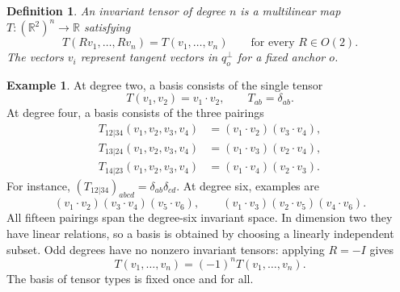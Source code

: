 \documentclass[11pt]{article}
\newcommand{\R}{\mathbb R}
\numberwithin{equation}{section}
\newtheorem{definition}[theorem]{Definition}
\theoremstyle{definition}
\newtheorem{example}[theorem]{Example}
\theoremstyle{plain}
\begin{document}
\begin{definition}
An invariant tensor of degree $n$ is a multilinear map
$T:(\R^2)^n\to\R$ satisfying
\begin{equation}
 T(Rv_1,\ldots,Rv_n)=T(v_1,\ldots,v_n)
 \qquad\text{for every }R\in O(2).
\end{equation}
The vectors $v_i$ represent tangent vectors in $q_o^\perp$ for a fixed anchor $o$.
\end{definition}

\begin{example}
At degree two, a basis consists of the single tensor
\begin{equation}
 T(v_1,v_2)=v_1\cdot v_2,
 \qquad T_{ab}=\delta_{ab}.
\end{equation}
At degree four, a basis consists of the three pairings
\begin{align}
 T_{12|34}(v_1,v_2,v_3,v_4)
   &=(v_1\cdot v_2)(v_3\cdot v_4),\\
 T_{13|24}(v_1,v_2,v_3,v_4)
   &=(v_1\cdot v_3)(v_2\cdot v_4),\\
 T_{14|23}(v_1,v_2,v_3,v_4)
   &=(v_1\cdot v_4)(v_2\cdot v_3).
\end{align}
For instance, $(T_{12|34})_{abcd}=\delta_{ab}\delta_{cd}$.
At degree six, examples are
\begin{equation}
 (v_1\cdot v_2)(v_3\cdot v_4)(v_5\cdot v_6),
 \qquad
 (v_1\cdot v_3)(v_2\cdot v_5)(v_4\cdot v_6).
\end{equation}
All fifteen pairings span the degree-six invariant space.  In
dimension two they have linear relations, so a basis is obtained
by choosing a linearly independent subset.  Odd degrees have no
nonzero invariant tensors: applying $R=-I$ gives
\begin{equation}
 T(v_1,\ldots,v_n)=(-1)^nT(v_1,\ldots,v_n).
\end{equation}
The basis of tensor types is fixed once and for all.
\end{example}
\end{document}
